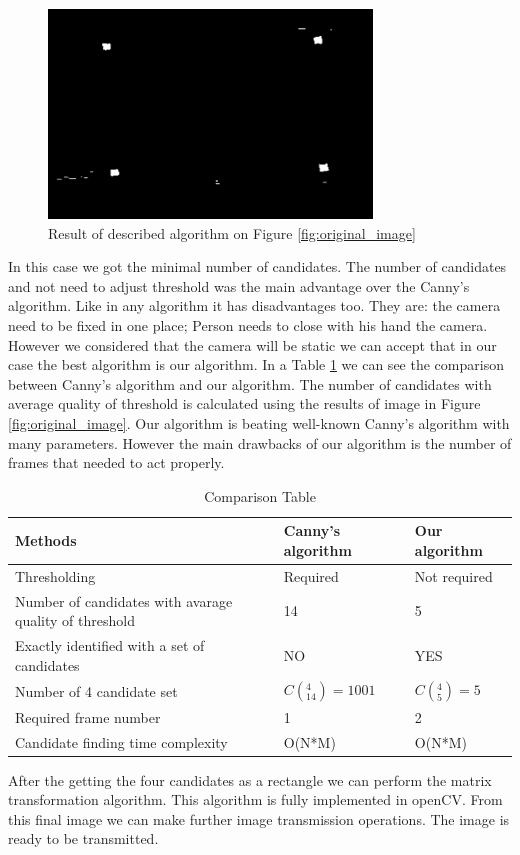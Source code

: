 \begin{figure}[h]
    \centering
    \includegraphics{Figures/after_taking_difference}
    \caption{Result of described algorithm on Figure \ref{fig:original_image}}
    \label{fig:after_taking_difference}
\end{figure}


In this case we got the minimal number of candidates. The number of candidates and not need to adjust threshold was the main advantage over the Canny’s algorithm. Like in any algorithm it has disadvantages too. They are: the camera need to be fixed in one place; Person needs to close with his hand the camera. However we considered that the camera will be static we can accept that in our case the best algorithm is our algorithm. In a Table \ref{tab:comparison_table} we can see the comparison between Canny’s algorithm and our algorithm. The number of candidates with average quality of threshold is calculated using the results of image in Figure \ref{fig:original_image}. Our algorithm is beating well-known Canny’s algorithm with many parameters. However the main drawbacks of our algorithm is the number of frames that needed to act properly.

\begin{longtable}[t]{|p{}|p{}|p{}|}
\caption{Comparison Table}\label{tab:comparison_table} \\
	\hline
	\textbf{Methods} & \textbf{Canny's algorithm} & \textbf{Our algorithm} \\
	\hline
	\endhead
	Thresholding 
	& Required
	& Not required\\
	\hline
	Number of candidates with avarage quality of threshold 
	& 14
	& 5 \\
	\hline
	Exactly identified with a set of candidates 
	& NO
	& YES\\
	\hline
	Number of 4 candidate set 
	& $C(_{14}^4) = 1001$
	& $C(_5^4) = 5$\\
	\hline
	Required frame number 
	& 1
	& 2\\
	\hline
	Candidate finding time complexity 
	& O(N*M)
	& O(N*M)\\
	\hline
\end{longtable}

After the getting the four candidates as a rectangle we can perform the matrix transformation algorithm. This algorithm is fully implemented in openCV. From this final image we can make further image transmission operations. The image is ready to be transmitted. 
